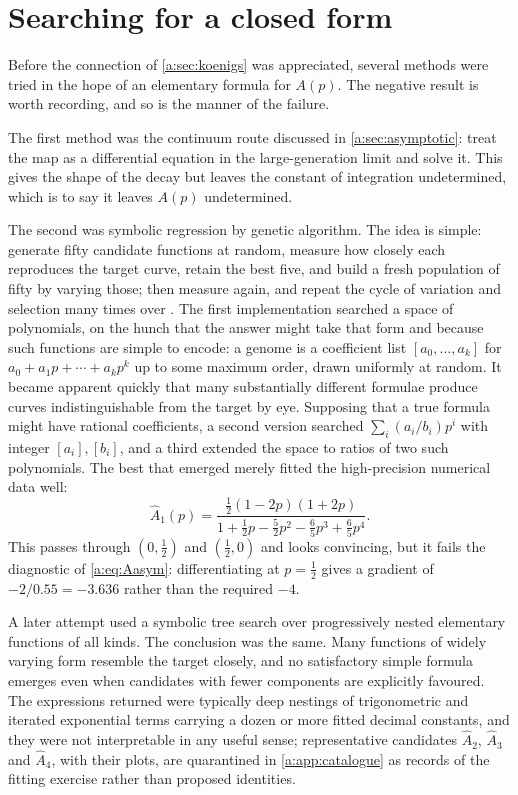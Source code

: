 \section{Searching for a closed form}
\label{a:sec:GA}

Before the connection of \cref{a:sec:koenigs} was appreciated, several methods were
tried in the hope of an elementary formula for $A(p)$. The negative result is worth
recording, and so is the manner of the failure.

The first method was the continuum route discussed in \cref{a:sec:asymptotic}:
treat the map as a differential equation in the large-generation limit and solve
it. This gives the shape of the decay but leaves the constant of integration
undetermined, which is to say it leaves $A(p)$ undetermined.

The second was symbolic regression by genetic algorithm. The idea is simple:
generate fifty candidate functions at random, measure how closely each reproduces
the target curve, retain the best five, and build a fresh population of fifty by
varying those; then measure again, and repeat the cycle of variation and selection
many times over \cite{stanley2002evolving,cohen2024physics}. The first
implementation searched a space of polynomials, on the hunch that the answer might
take that form and because such functions are simple to encode: a genome is a
coefficient list $[a_0,\dots,a_k]$ for $a_0+a_1p+\cdots+a_kp^k$ up to some maximum
order, drawn uniformly at random. It became apparent quickly that many
substantially different formulae produce curves indistinguishable from the target
by eye. Supposing that a true formula might have rational coefficients, a second
version searched $\sum_i(a_i/b_i)p^i$ with integer $[a_i],[b_i]$, and a third
extended the space to ratios of two such polynomials. The best that emerged merely
fitted the high-precision numerical data well:
\begin{equation}
\label{a:eq:A1hat}
\hat A_1(p) = \frac{\tfrac12(1-2p)(1+2p)}
{1+\tfrac12p-\tfrac52p^2-\tfrac65p^3+\tfrac65p^4} .
\end{equation}
This passes through $(0,\tfrac12)$ and $(\tfrac12,0)$ and looks convincing, but it
fails the diagnostic of \cref{a:eq:Aasym}: differentiating at $p=\tfrac12$ gives a
gradient of $-2/0.55 = -3.636$ rather than the required $-4$.

A later attempt used a symbolic tree search over progressively nested elementary
functions of all kinds. The conclusion was the same. Many functions of widely
varying form resemble the target closely, and no satisfactory simple formula
emerges even when candidates with fewer components are explicitly favoured. The
expressions returned were typically deep nestings of trigonometric and iterated
exponential terms carrying a dozen or more fitted decimal constants, and they were
not interpretable in any useful sense; representative candidates
$\hat A_2$, $\hat A_3$ and $\hat A_4$, with their plots, are quarantined in
\cref{a:app:catalogue} as records of the fitting exercise rather than proposed
identities.

